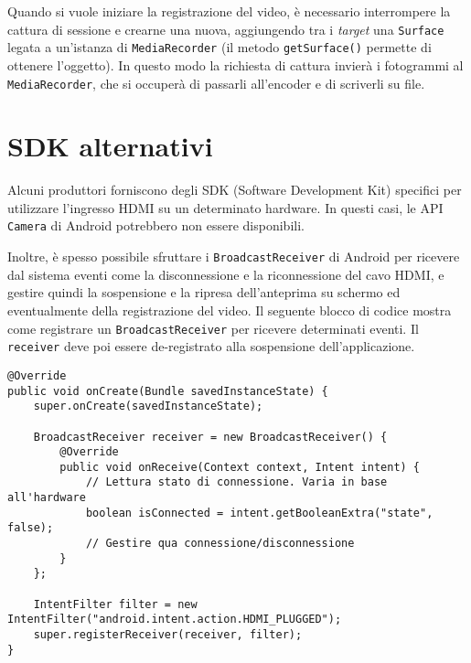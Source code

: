 Quando si vuole iniziare la registrazione del video, è necessario interrompere la cattura di sessione e crearne una nuova, aggiungendo tra i \emph{target} una \texttt{Surface} legata a un'istanza di \texttt{MediaRecorder} (il metodo \texttt{getSurface()} permette di ottenere l'oggetto). In questo modo la richiesta di cattura invierà i fotogrammi al \texttt{MediaRecorder}, che si occuperà di passarli all'encoder e di scriverli su file.

\section{SDK alternativi}
\label{sec:hdmi_sdk}

Alcuni produttori forniscono degli SDK (Software Development Kit) specifici per utilizzare l'ingresso HDMI su un determinato hardware. In questi casi, le API \texttt{Camera} di Android potrebbero non essere disponibili.

Inoltre, è spesso possibile sfruttare i \texttt{BroadcastReceiver} di Android per ricevere dal sistema eventi come la disconnessione e la riconnessione del cavo HDMI, e gestire quindi la sospensione e la ripresa dell'anteprima su schermo ed eventualmente della registrazione del video. Il seguente blocco di codice mostra come registrare un \texttt{BroadcastReceiver} per ricevere determinati eventi. Il \texttt{receiver} deve poi essere de-registrato alla sospensione dell'applicazione.


\begin{verbatim}
@Override
public void onCreate(Bundle savedInstanceState) {
    super.onCreate(savedInstanceState);

    BroadcastReceiver receiver = new BroadcastReceiver() {
        @Override
        public void onReceive(Context context, Intent intent) {
            // Lettura stato di connessione. Varia in base all'hardware
            boolean isConnected = intent.getBooleanExtra("state", false);
            // Gestire qua connessione/disconnessione
        }
    };
    
    IntentFilter filter = new IntentFilter("android.intent.action.HDMI_PLUGGED");
    super.registerReceiver(receiver, filter);
}
\end{verbatim}

